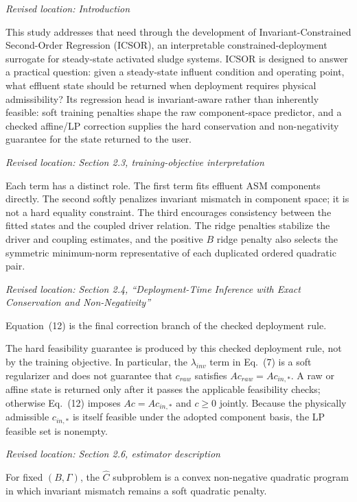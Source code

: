 \documentclass[11pt,a4paper]{article}
\newcommand{\excerptlocation}[1]{\par\noindent\textit{Revised location: #1}\par}
\begin{document}
\excerptlocation{Introduction}
\begin{revisionexcerpt}
This study addresses that need through the development of Invariant-Constrained Second-Order Regression (ICSOR), an interpretable constrained-deployment surrogate for steady-state activated sludge systems. ICSOR is designed to answer a practical question: given a steady-state influent condition and operating point, what effluent state should be returned when deployment requires physical admissibility? Its regression head is invariant-aware rather than inherently feasible: soft training penalties shape the raw component-space predictor, and a checked affine/LP correction supplies the hard conservation and non-negativity guarantee for the state returned to the user.
\end{revisionexcerpt}

\excerptlocation{Section 2.3, training-objective interpretation}
\begin{revisionexcerpt}
Each term has a distinct role. The first term fits effluent ASM components directly. The second softly penalizes invariant mismatch in component space; it is not a hard equality constraint. The third encourages consistency between the fitted states and the coupled driver relation. The ridge penalties stabilize the driver and coupling estimates, and the positive $B$ ridge penalty also selects the symmetric minimum-norm representative of each duplicated ordered quadratic pair.
\end{revisionexcerpt}

\excerptlocation{Section 2.4, ``Deployment-Time Inference with Exact Conservation and Non-Negativity''}
\begin{revisionexcerpt}
Equation~(12) is the final correction branch of the checked deployment rule.

The hard feasibility guarantee is produced by this checked deployment rule, not by the training objective. In particular, the $\lambda_{inv}$ term in Eq.~(7) is a soft regularizer and does not guarantee that $c_{raw}$ satisfies $Ac_{raw}=Ac_{in,*}$. A raw or affine state is returned only after it passes the applicable feasibility checks; otherwise Eq.~(12) imposes $Ac=Ac_{in,*}$ and $c\geq 0$ jointly. Because the physically admissible $c_{in,*}$ is itself feasible under the adopted component basis, the LP feasible set is nonempty.
\end{revisionexcerpt}

\excerptlocation{Section 2.6, estimator description}
\begin{revisionexcerpt}
For fixed $(B, \Gamma)$, the $\widehat{C}$ subproblem is a convex non-negative quadratic program in which invariant mismatch remains a soft quadratic penalty.
\end{revisionexcerpt}
\end{document}
